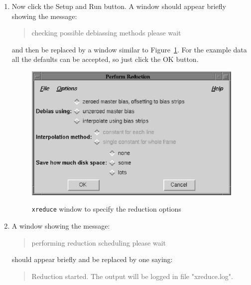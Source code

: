 \documentclass[twoside,11pt]{article}
\begin{document}
\begin{enumerate}
  \begin{quote}
   {\sf Setting data descriptions, please wait}
  \end{quote}

   and you will be returned to the {\tt xreduce} main window.

  \item Now click the {\sf Setup and Run} button.  A window should appear
   briefly showing the message:

  \begin{quote}
   {\sf checking possible debiassing methods please wait}
  \end{quote}

   and then be replaced by a window similar to Figure~\ref{PERFORMREDUCTION}.
   For the example data all the defaults can be accepted, so just click the
   {\sf OK} button.

  \begin{figure}[htbp]
     \centering
      \includegraphics[totalheight=3in]{sc5_performreduction.ps}
      \begin{quote}
      \caption{{\tt xreduce} window to specify the reduction options
      \label{PERFORMREDUCTION} }
      \end{quote}
  \end{figure}

  \item A window showing the message:

  \begin{quote}
   {\sf performing reduction scheduling please wait}
  \end{quote}

   should appear briefly and be replaced by one saying:

  \begin{quote}
   {\sf Reduction started.  The output will be logged in file
   "xreduce.log".}
  \end{quote}


\end{enumerate}
\end{document}
